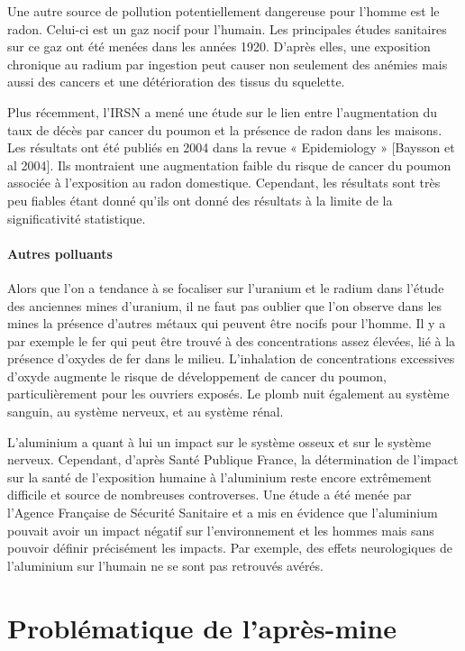 \documentclass{article}
\begin{document}
Une autre source de pollution potentiellement dangereuse pour l’homme est le radon. Celui-ci est un gaz nocif pour l’humain. Les principales études sanitaires sur ce gaz ont été menées dans les années 1920. D’après elles, une exposition chronique au radium par ingestion peut causer non seulement des anémies mais aussi des cancers et une détérioration des tissus du squelette.

Plus récemment, l’IRSN a mené une étude sur le lien entre l’augmentation du taux de décès par cancer du poumon et la présence de radon dans les maisons. Les résultats ont été publiés en 2004 dans la revue « Epidemiology » [Baysson et al 2004]. Ils montraient une augmentation faible du risque de cancer du poumon associée à l’exposition au radon  domestique. Cependant, les résultats sont très peu fiables étant donné qu’ils ont donné des résultats à la limite de la significativité statistique.  

\paragraph{Autres polluants}

Alors que l’on a tendance à se focaliser sur l’uranium et le radium dans l’étude des anciennes mines d’uranium, il ne faut pas oublier que l’on observe dans les mines la présence d'autres métaux qui peuvent être nocifs pour l’homme. Il y a par exemple le fer qui peut être trouvé à des concentrations assez élevées, lié à la présence d'oxydes de fer dans le milieu.  L'inhalation de concentrations excessives d'oxyde augmente le risque de développement de cancer du poumon, particulièrement pour les ouvriers exposés. Le plomb nuit également au système sanguin, au système nerveux, et au système rénal.

L’aluminium a quant à lui un impact sur le système osseux et sur le système nerveux. Cependant, d’après Santé Publique France, la détermination de l'impact sur la santé de l'exposition humaine à l'aluminium reste encore extrêmement difficile et source de nombreuses controverses. Une étude a été menée par l’Agence Française de Sécurité Sanitaire et a mis en évidence que l’aluminium pouvait avoir un impact négatif sur l’environnement et les hommes mais sans pouvoir définir précisément les impacts.  Par exemple, des effets neurologiques de l’aluminium sur l’humain ne se sont pas retrouvés avérés.

\newpage
\section{Problématique de l’après-mine}
\end{document}
